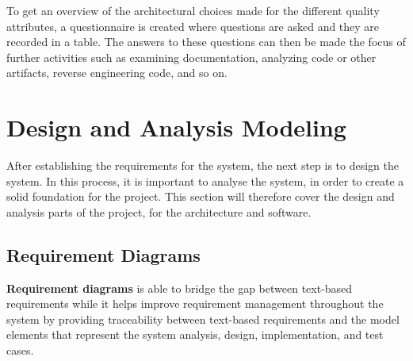 To get an overview of the architectural choices made for the different quality attributes, a questionnaire is created where questions are asked and they are recorded in a table. The answers to these questions can then be made the focus of further activities such as examining documentation, analyzing code or other artifacts, reverse engineering code, and so on.







\section{Design and Analysis Modeling}
\label{sec:design-and-analysis-modelling}

After establishing the requirements for the system, the next step is to design the system. In this process, it is important to analyse the system, in order to create a solid foundation for the project.
This section will therefore cover the design and analysis parts of the project, for the architecture and software.





\subsection{Requirement Diagrams}

\textbf{Requirement diagrams} is able to bridge the gap between text-based requirements while it helps improve requirement management throughout the system by providing traceability between text-based requirements and the model elements that represent the system analysis, design, implementation, and test cases.

